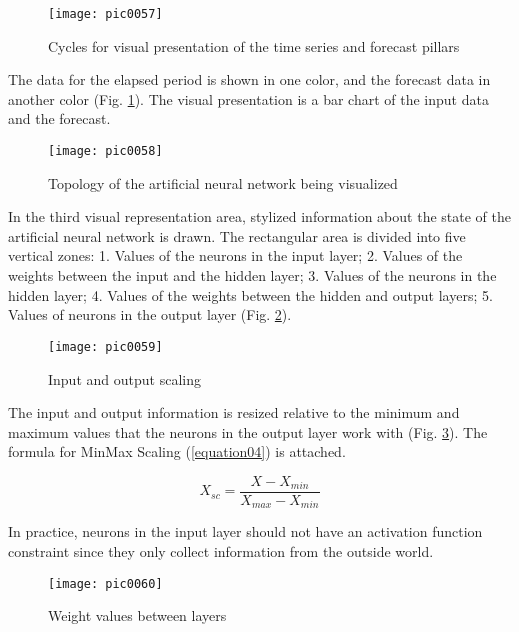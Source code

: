 \begin{figure}[h]
\centering
\texttt{[image: pic0057]}
\caption{Cycles for visual presentation of the time series and forecast pillars}
\label{fig:pic0057}
\end{figure}
\FloatBarrier

The data for the elapsed period is shown in one color, and the forecast data in another color (Fig. \ref{fig:pic0057}). The visual presentation is a bar chart of the input data and the forecast.

\begin{figure}[h]
\centering
\texttt{[image: pic0058]}
\caption{Topology of the artificial neural network being visualized}
\label{fig:pic0058}
\end{figure}
\FloatBarrier

In the third visual representation area, stylized information about the state of the artificial neural network is drawn. The rectangular area is divided into five vertical zones: 1. Values of the neurons in the input layer; 2. Values of the weights between the input and the hidden layer; 3. Values of the neurons in the hidden layer; 4. Values of the weights between the hidden and output layers; 5. Values of neurons in the output layer (Fig. \ref{fig:pic0058}).

\begin{figure}[h]
\centering
\texttt{[image: pic0059]}
\caption{Input and output scaling}
\label{fig:pic0059}
\end{figure}
\FloatBarrier

The input and output information is resized relative to the minimum and maximum values that the neurons in the output layer work with (Fig. \ref{fig:pic0059}). The formula for MinMax Scaling (\ref{equation04}) is attached.

\begin{equation}
\label{equation04}
X_{sc} = \frac{X-X_{min}}{X_{max}-X_{min}}
\end{equation}

In practice, neurons in the input layer should not have an activation function constraint since they only collect information from the outside world.

\begin{figure}[h]
\centering
\texttt{[image: pic0060]}
\caption{Weight values between layers}
\label{fig:pic0060}
\end{figure}
\FloatBarrier

